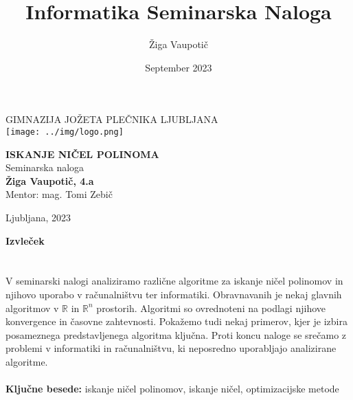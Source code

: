 \documentclass[a4paper,12pt,openright, oneside]{book}
\title{Informatika Seminarska Naloga}
\author{Žiga Vaupotič}
\date{September 2023}
\renewenvironment{abstract}
 {\par\noindent \hfill \textbf{Izvleček}  \hfill\ \ignorespaces \\}
 {\par\medskip \medskip}
\newcommand{\R}{\mathbb{R}}
\begin{document}
\begin{titlepage}
   \begin{center}
        \large {GIMNAZIJA JOŽETA PLEČNIKA LJUBLJANA} \\
        \vspace{1 cm}
       \texttt{[image: ../img/logo.png]}
            
       \vspace{3cm}
       \textbf{\Large ISKANJE NIČEL POLINOMA}\\
       \vspace{0.5 cm}
        \large {Seminarska naloga}\\
        \vspace{ 1 cm}
        \large \textbf{Žiga Vaupotič, 4.a}\\
        \vspace{ 7 cm}
         {Mentor: } mag. Tomi Zebič
           \vfill  

    Ljubljana, 2023
   \end{center}
\end{titlepage}
\begin{abstract}
\\\\
V seminarski nalogi analiziramo različne algoritme za iskanje ničel polinomov in njihovo uporabo v računalništvu ter informatiki. Obravnavanih je nekaj glavnih algoritmov v $\R$ in $\R^n$ prostorih. Algoritmi so ovrednoteni na podlagi njihove konvergence in časovne zahtevnosti. Pokažemo tudi nekaj primerov, kjer je izbira posameznega predstavljenega algoritma ključna. Proti koncu naloge se srečamo z problemi v informatiki in računalništvu, ki neposredno uporabljajo analizirane algoritme. 
\\\\
    \small{\textbf{Ključne besede: }iskanje ničel polinomov, iskanje ničel, optimizacijske metode}
\end{abstract}

\newpage
\tableofcontents
\newpage

\newpage


\newpage

\newpage

\newpage

\newpage


\newpage

\end{document}
